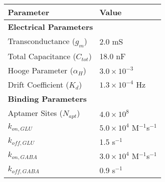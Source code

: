 \begin{tabular}{ll}
\toprule
Parameter & Value \\
\midrule
\multicolumn{2}{l}{\textbf{Electrical Parameters}} \\
Transconductance ($g_m$) & 2.0 mS \\
Total Capacitance ($C_{tot}$) & 18.0 nF \\
Hooge Parameter ($\alpha_H$) & $3.0 \times 10^{-3}$ \\
Drift Coefficient ($K_d$) & $1.3 \times 10^{-4}$ Hz \\
\midrule
\multicolumn{2}{l}{\textbf{Binding Parameters}} \\
Aptamer Sites ($N_{apt}$) & $4.0 \times 10^{8}$ \\
$k_{on,GLU}$ & $5.0 \times 10^{4}$ M$^{-1}$s$^{-1}$ \\
$k_{off,GLU}$ & 1.5 s$^{-1}$ \\
$k_{on,GABA}$ & $3.0 \times 10^{4}$ M$^{-1}$s$^{-1}$ \\
$k_{off,GABA}$ & 0.9 s$^{-1}$ \\
\bottomrule
\end{tabular}
